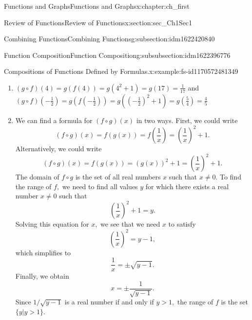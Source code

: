 \documentclass[oneside,10pt,]{book}
\numberwithin{equation}{section}
\newcommand{\lt}{<}
\newcommand{\gt}{>}
\begin{document}
\begin{chapterptx}{Functions and Graphs}{}{Functions and Graphs}{}{}{x:chapter:ch_first}
\begin{sectionptx}{Review of Functions}{}{Review of Functions}{}{}{x:section:sec_Ch1Sec1}
\begin{subsectionptx}{Combining Functions}{}{Combining Functions}{}{}{g:subsection:idm1622420840}
\begin{subsubsectionptx}{Function Composition}{}{Function Composition}{}{}{g:subsubsection:idm1622396776}
\begin{example}{Compositions of Functions Defined by Formulas.}{x:example:fs-id1170572481349}
\begin{enumerate}
Since \(x^2+1\neq 0\) for all real numbers \(x,\) the domain of \((g\circ f)(x)\) is the set of all real numbers. Since \(0 \lt 1/(x^2+1) \leq  1,\) the range is, at most, the interval \((0,1].\) To show that the range is this entire interval, we let \(y=1/(x^2+1)\) and solve this equation for \(x\) to show that for all \(y\) in the interval \((0,1],\) there exists a real number \(x\) such that \(y=1/(x^2+1).\) Solving this equation for \(x,\) we see that \(x^2+1=1/y,\) which implies that%
\begin{equation*}
x=\pm\sqrt{\frac{1}{y}-1}.
\end{equation*}
If \(y\) is in the interval \((0,1],\) the expression under the radical is nonnegative, and therefore there exists a real number \(x\) such that \(1/(x^2+1)=y.\) We conclude that the range of \(g\circ f\) is the interval \((0,1].\)%
\item{}\((g\circ f)(4)=g(f(4))=g(4^2+1)=g(17)=\frac{1}{17}\)  and \((g\circ f)(-\frac{1}{2})=g(f(-\frac{1}{2}))=g((-\frac{1}{2})^2+1)=g(\frac{5}{4})=\frac{4}{5}\)%
\item{}We can find a formula for \((f\circ g)(x)\) in two ways. First, we could write%
\begin{equation*}
(f\circ g)(x)=f(g(x))=f\left(\frac{1}{x}\right)=\left(\frac{1}{x}\right)^2+1.
\end{equation*}
Alternatively, we could write%
\begin{equation*}
(f\circ g)(x)=f(g(x))=(g(x))^2+1=\left(\frac{1}{x}\right)^2+1.
\end{equation*}
The domain of \(f\circ g\) is the set of all real numbers \(x\) such that \(x\neq 0.\) To find the range of \(f,\) we need to find all values \(y\) for which there exists a real number \(x\neq0\) such that%
\begin{equation*}
\left(\frac{1}{x}\right)^2+1=y.
\end{equation*}
Solving this equation for \(x,\) we see that we need \(x\) to satisfy%
\begin{equation*}
\left(\frac{1}{x}\right)^2=y-1,
\end{equation*}
which simplifies to%
\begin{equation*}
\frac{1}{x}=\pm\sqrt{y-1}.
\end{equation*}
Finally, we obtain%
\begin{equation*}
x=\pm\frac{1}{\sqrt{y-1}}.
\end{equation*}
Since \(1/\sqrt{y-1}\) is a real number if and only if \(y\gt 1,\) the range of \(f\) is the set \(\{y|y\gt 1\}.\)%

\end{enumerate}
\end{example}
\end{subsubsectionptx}
\end{subsectionptx}
\end{sectionptx}
\end{chapterptx}
\end{document}
